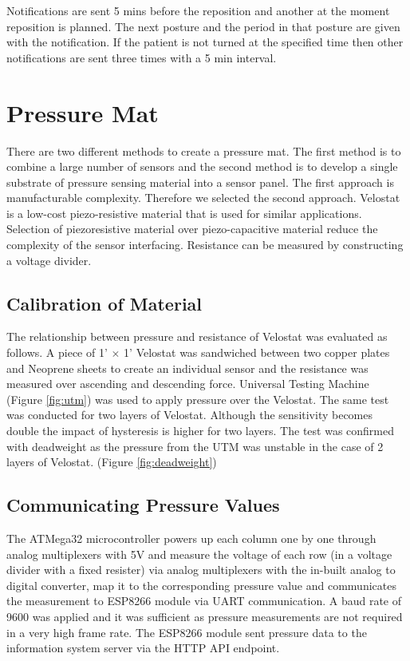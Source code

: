 Notifications are sent 5 mins before the reposition and another at the moment reposition is planned. The next posture and the period in that posture are given with the notification. If the patient is not turned at the specified time then other notifications are sent three times with a 5 min interval.




\section{Pressure Mat}

There are two different methods to create a pressure mat. The first method is to combine a large number of sensors and the second method is to develop a single substrate of pressure sensing material into a sensor panel. The first approach is manufacturable complexity. Therefore we selected the second approach. Velostat\textsuperscript{\textregistered} is a low-cost piezo-resistive material that is used for similar applications. \cite{velostat1,velostat2,velsensor} Selection of piezoresistive material over piezo-capacitive material reduce the complexity of the sensor interfacing. Resistance can be measured by constructing a voltage divider. 


\subsection{Calibration of Material}

The relationship between pressure and resistance of Velostat was evaluated as follows. A piece of 1' $\times$ 1' Velostat was sandwiched between two copper plates and Neoprene sheets to create an individual sensor and the resistance was measured over ascending and descending force. 
 Universal Testing Machine (Figure \ref{fig:utm}) was used to apply pressure over the Velostat. The same test was conducted for two layers of Velostat. Although the sensitivity becomes double the impact of hysteresis is higher for two layers. The test was confirmed with deadweight as the pressure from the UTM was unstable in the case of 2 layers of Velostat. (Figure \ref{fig:deadweight})

\subsection{Communicating Pressure Values} 

The ATMega32 microcontroller powers up each column one by one through analog multiplexers with 5V and measure the voltage of each row (in a voltage divider with a fixed resister) via analog multiplexers with the in-built analog to digital converter, map it to the corresponding pressure value and communicates the measurement to ESP8266 module via UART communication. A baud rate of 9600 was applied and it was sufficient as pressure measurements are not required in a very high frame rate. The ESP8266 module sent pressure data to the information system server via the HTTP API endpoint.


